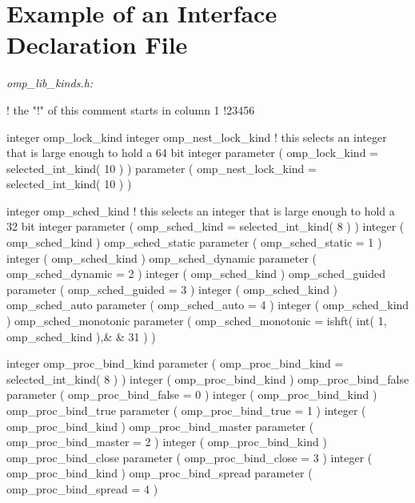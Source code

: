
{\section{Example of an Interface Declaration  File}}
\label{sec:Example of an Interface Declaration include File}
\emph{omp\_lib\_kinds.h:}
{\small \begin{ompfSyntax}
!      the "!" of this comment starts in column 1
!23456

      integer omp_lock_kind
      integer omp_nest_lock_kind
! this selects an integer that is large enough to hold a 64 bit integer
      parameter ( omp_lock_kind = selected_int_kind( 10 ) )
      parameter ( omp_nest_lock_kind = selected_int_kind( 10 ) )

      integer omp_sched_kind
! this selects an integer that is large enough to hold a 32 bit integer
      parameter ( omp_sched_kind = selected_int_kind( 8 ) )
      integer ( omp_sched_kind ) omp_sched_static
      parameter ( omp_sched_static = 1 )
      integer ( omp_sched_kind ) omp_sched_dynamic
      parameter ( omp_sched_dynamic = 2 )
      integer ( omp_sched_kind ) omp_sched_guided
      parameter ( omp_sched_guided = 3 )
      integer ( omp_sched_kind ) omp_sched_auto
      parameter ( omp_sched_auto = 4 )
      integer ( omp_sched_kind ) omp_sched_monotonic
      parameter ( omp_sched_monotonic = ishft( int( 1, omp_sched_kind ),&
     & 31 ) )

      integer omp_proc_bind_kind
      parameter ( omp_proc_bind_kind = selected_int_kind( 8 ) )
      integer ( omp_proc_bind_kind ) omp_proc_bind_false
      parameter ( omp_proc_bind_false = 0 )
      integer ( omp_proc_bind_kind ) omp_proc_bind_true
      parameter ( omp_proc_bind_true = 1 )
      integer ( omp_proc_bind_kind ) omp_proc_bind_master
      parameter ( omp_proc_bind_master = 2 )
      integer ( omp_proc_bind_kind ) omp_proc_bind_close
      parameter ( omp_proc_bind_close = 3 )
      integer ( omp_proc_bind_kind ) omp_proc_bind_spread
      parameter ( omp_proc_bind_spread = 4 )


\end{ompfSyntax}}
